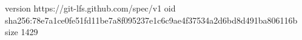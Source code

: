 version https://git-lfs.github.com/spec/v1
oid sha256:78e7a1ce0fe51fd11be7a8f095237e1c6c9ae4f37534a2d6bd8d491ba806116b
size 1429
